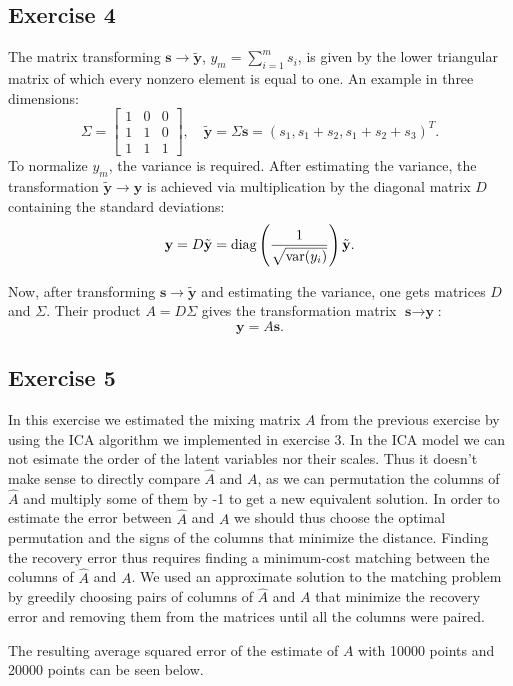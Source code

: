 \documentclass{article}
\begin{document}
\subsection{Exercise 4}
The matrix transforming $\textbf{s} \to \tilde{\textbf{y}}$, $y_m = \sum_{i=1}^m s_i$, is given by
the lower triangular matrix of which every nonzero element is equal to
one. An example in three dimensions:
\[
\Sigma =
\left[ \begin{array}{ccc}
1 & 0 & 0 \\
1 & 1 & 0 \\
1 & 1 & 1 \end{array} \right],
\quad
\tilde{\textbf{y}} = \Sigma \textbf{s} = (s_1, s_1 + s_2, s_1 + s_2 + s_3)^T.
\]
To normalize $y_m$, the variance is required. After estimating
the variance, the transformation $\tilde{\textbf{y}} \to \textbf{y}$
is achieved via multiplication by the diagonal matrix $D$ containing the
standard deviations: 
\[
\textbf{y} = D \tilde{\textbf{y}}= \textup{diag} \left( \frac{1}{\sqrt{\textup{var}(y_i)}}
\right) \tilde{\textbf{y}}.
\]

Now, after transforming $\textbf{s} \to \tilde{\textbf{y}}$ and
estimating the variance, one gets matrices $D$ and $\Sigma$. Their
product $A = D \Sigma$ gives the transformation matrix $\textbf{s} \to
\textbf{y}$:
\[
\textbf{y} = A\textbf{s}.
\]
\subsection{Exercise 5}
In this exercise we estimated the mixing matrix $A$ from the previous
exercise by using the ICA algorithm we implemented in exercise 3.
In the ICA model we can not esimate the order of the latent variables nor their scales.
Thus it doesn't make sense to directly compare $\hat{A}$ and $A$, as we can permutation the columns of $\hat{A}$ and multiply some of them by -1 to get a new equivalent solution.
In order to estimate the error between $\hat{A}$ and $A$ we should thus choose the optimal permutation and the signs of the columns that minimize the distance.
Finding the recovery error thus requires finding a minimum-cost matching between the columns of $\hat{A}$ and $A$.
We used an approximate solution to the matching problem by greedily choosing pairs of columns of $\hat{A}$ and $A$ that minimize the recovery error and removing them from the matrices until all the columns were paired.

The resulting average squared error of the estimate of $A$ with 10000 points and
20000 points can be seen below.
\end{document}
